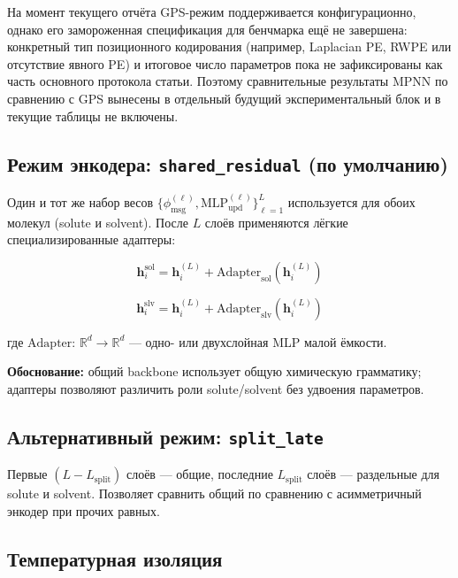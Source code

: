 \documentclass[11pt]{article}
\begin{document}
На момент текущего отчёта GPS-режим поддерживается конфигурационно, однако его замороженная спецификация для бенчмарка ещё не завершена: конкретный тип позиционного кодирования (например, Laplacian PE, RWPE или отсутствие явного PE) и итоговое число параметров пока не зафиксированы как часть основного протокола статьи. Поэтому сравнительные результаты MPNN по сравнению с GPS вынесены в отдельный будущий экспериментальный блок и в текущие таблицы не включены.

\subsection{Режим энкодера: \texttt{shared\_residual} (по умолчанию)}

Один и тот же набор весов $\{\phi_{\mathrm{msg}}^{(\ell)}, \mathrm{MLP}_{\mathrm{upd}}^{(\ell)}\}_{\ell=1}^{L}$ используется для обоих молекул (solute и solvent). После $L$ слоёв применяются лёгкие специализированные адаптеры:

\begin{equation*}
\mathbf{h}_i^{\mathrm{sol}} = \mathbf{h}_i^{(L)} + \mathrm{Adapter}_{\mathrm{sol}}(\mathbf{h}_i^{(L)})
\end{equation*}

\begin{equation*}
\mathbf{h}_i^{\mathrm{slv}} = \mathbf{h}_i^{(L)} + \mathrm{Adapter}_{\mathrm{slv}}(\mathbf{h}_i^{(L)})
\end{equation*}

где $\mathrm{Adapter}$: $\mathbb{R}^{d} \to \mathbb{R}^{d}$ --- одно- или двухслойная MLP малой ёмкости.

\textbf{Обоснование:} общий backbone использует общую химическую грамматику; адаптеры позволяют различить роли solute/solvent без удвоения параметров.

\subsection{Альтернативный режим: \texttt{split\_late}}

Первые $(L - L_{\mathrm{split}})$ слоёв --- общие, последние $L_{\mathrm{split}}$ слоёв --- раздельные для solute и solvent. Позволяет сравнить общий по сравнению с асимметричный энкодер при прочих равных.

\subsection{Температурная изоляция}
\end{document}
